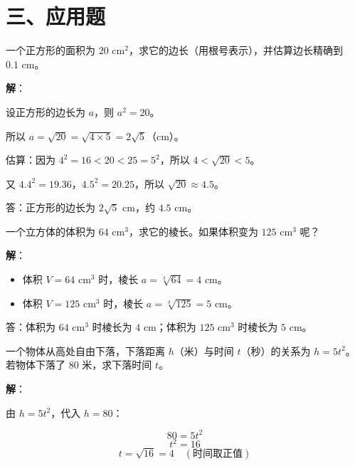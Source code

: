 \documentclass[12pt, a4paper]{ctexart}
\begin{document}
\section*{\textcolor{apppurple}{三、应用题}}

\begin{appbox}[【应用1】正方形面积与边长]
一个正方形的面积为 $20\text{ cm}^2$，求它的边长（用根号表示），并估算边长精确到 $0.1\text{ cm}$。
\end{appbox}

\textbf{解}：

设正方形的边长为 $a$，则 $a^2 = 20$。

所以 $a = \sqrt{20} = \sqrt{4 \times 5} = 2\sqrt{5}$（cm）。

估算：因为 $4^2 = 16 < 20 < 25 = 5^2$，所以 $4 < \sqrt{20} < 5$。

又 $4.4^2 = 19.36$，$4.5^2 = 20.25$，所以 $\sqrt{20} \approx 4.5$。

答：正方形的边长为 $2\sqrt{5}\text{ cm}$，约 $4.5\text{ cm}$。

\vspace{6pt}

\begin{appbox}[【应用2】立方体体积问题]
一个立方体的体积为 $64\text{ cm}^3$，求它的棱长。如果体积变为 $125\text{ cm}^3$ 呢？
\end{appbox}

\textbf{解}：

\begin{itemize}[leftmargin=2em]
  \item 体积 $V = 64\text{ cm}^3$ 时，棱长 $a = \sqrt[3]{64} = 4\text{ cm}$。
  \item 体积 $V = 125\text{ cm}^3$ 时，棱长 $a = \sqrt[3]{125} = 5\text{ cm}$。
\end{itemize}

答：体积为 $64\text{ cm}^3$ 时棱长为 $4\text{ cm}$；体积为 $125\text{ cm}^3$ 时棱长为 $5\text{ cm}$。

\vspace{6pt}

\begin{appbox}[【应用3】自由落体中的平方根]
一个物体从高处自由下落，下落距离 $h$（米）与时间 $t$（秒）的关系为 $h = 5t^2$。若物体下落了 $80$ 米，求下落时间 $t$。
\end{appbox}

\textbf{解}：

由 $h = 5t^2$，代入 $h = 80$：

\[
80 = 5t^2
\]
\[
t^2 = 16
\]
\[
t = \sqrt{16} = 4 \quad (\text{时间取正值})
\]
\end{document}
